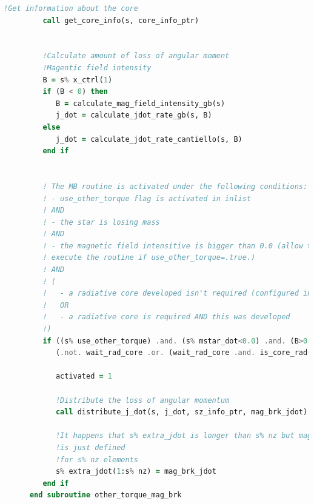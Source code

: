 \begin{lstlisting}[language=Fortran, caption={Rutina de frenado magnético.}, label={lst:torque_mb_hook}]
         !Get information about the core
         call get_core_info(s, core_info_ptr)


         !Calculate amount of loss of angular moment
         !Magentic field intensity
         B = s% x_ctrl(1)
         if (B < 0) then
            B = calculate_mag_field_intensity_gb(s)
            j_dot = calculate_jdot_rate_gb(s, B)
         else
            j_dot = calculate_jdot_rate_cantiello(s, B)
         end if
         

         ! The MB routine is activated under the following conditions:
         ! - use_other_torque flag is activated in inlist
         ! AND
         ! - the star is losing mass
         ! AND
         ! - the magnetic field intensitive is bigger than 0.0 (allow to 
         ! execute the routine if use_other_torque=.true.)
         ! AND
         ! (
         !   - a radiative core developed isn't required (configured in inlist)
         !   OR
         !   - a radiative core is required AND this was developed
         !)
         if ((s% use_other_torque) .and. (s% mstar_dot<0.0) .and. (B>0.0) .and. &
            (.not. wait_rad_core .or. (wait_rad_core .and. is_core_rad(s)))) then

            activated = 1

            !Distribute the loss of angular momentum
            call distribute_j_dot(s, j_dot, sz_info_ptr, mag_brk_jdot)

            !It happens that s% extra_jdot is longer than s% nz but mag_brk_jdot
            !is just defined
            !for s% nz elements
            s% extra_jdot(1:s% nz) = mag_brk_jdot
         end if
      end subroutine other_torque_mag_brk
\end{lstlisting}

